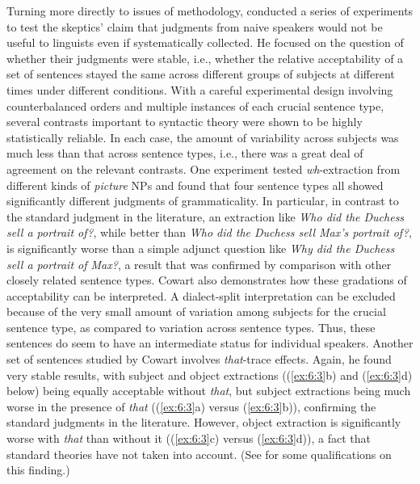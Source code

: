  Turning more directly to issues of methodology, \citep[12\textendash{}27]{Cowart1997} conducted a
 series of experiments to test the skeptics' claim that judgments  from naive speakers would not be useful to linguists even if systematically collected. He focused on the question of whether their judgments were stable, i.e., whether the relative acceptability of a set of sentences stayed the same across different groups of subjects at different times under different conditions. With a careful experimental design involving counterbalanced orders and multiple instances of each crucial sentence type, several contrasts important to syntactic theory were shown to be highly statistically reliable. In each case, the amount of variability across subjects was much less than that across sentence types, i.e., there was a great deal of agreement on the relevant contrasts. One experiment tested \textit{wh}-extraction from different kinds of \textit{picture} NPs and found that  four sentence types all showed significantly different judgments of grammaticality. In particular,  in contrast to the standard judgment in the literature, an extraction like \textit{Who did the Duchess sell a portrait of?}, while better than \textit{Who did the Duchess sell Max's portrait of?}, is significantly  worse than a simple adjunct question like \textit{Why did the Duchess sell a portrait of Max?}, a result that was confirmed by comparison with other closely related  sentence types. Cowart also demonstrates  how  these  gradations of acceptability  can be interpreted. A dialect-split interpretation can be excluded
 because of the very small amount of variation among subjects for the crucial sentence type, as compared to variation across sentence types. Thus, these sentences do seem to have an intermediate status for individual speakers. Another set of sentences studied by Cowart involves \textit{that}-trace effects. Again, he found very stable results, with subject and object extractions ((\ref{ex:6:3}b) and (\ref{ex:6:3}d) below) being equally acceptable without \textit{that}, but subject extractions being much worse in the presence of \textit{that} ((\ref{ex:6:3}a) versus (\ref{ex:6:3}b)), confirming the standard judgments in the literature. However, object extraction is significantly worse with \textit{that} than without it ((\ref{ex:6:3}c) versus (\ref{ex:6:3}d)), a fact that standard theories have not taken into account. (See \citet[12\textendash{}27]{Cowart1997} for some qualifications on this finding.)


